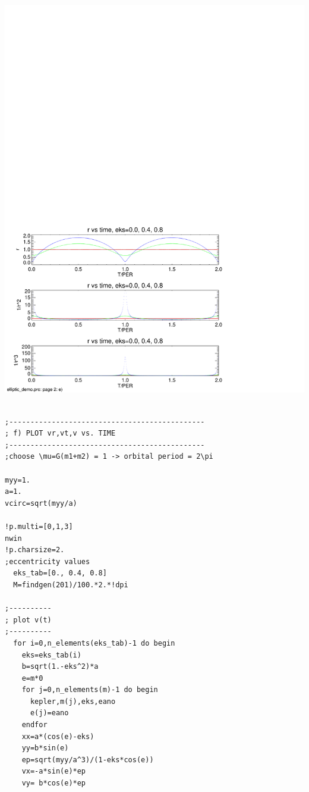 \documentclass[a4paper,12pt]{article}
\def\red{\color{red}}
\begin{document}
{{{{\vspace{-12cm}
\includegraphics[width=0.9\paperwidth]{elliptic_demo_2.pdf}
\clearpage


{\red \scriptsize
\begin{verbatim}

;----------------------------------------------
; f) PLOT vr,vt,v vs. TIME
;----------------------------------------------
;choose \mu=G(m1+m2) = 1 -> orbital period = 2\pi

myy=1.
a=1.
vcirc=sqrt(myy/a)

!p.multi=[0,1,3]
nwin
!p.charsize=2.
;eccentricity values
  eks_tab=[0., 0.4, 0.8]
  M=findgen(201)/100.*2.*!dpi

;---------- 
; plot v(t)
;---------- 
  for i=0,n_elements(eks_tab)-1 do begin
    eks=eks_tab(i)
    b=sqrt(1.-eks^2)*a
    e=m*0
    for j=0,n_elements(m)-1 do begin
      kepler,m(j),eks,eano
      e(j)=eano
    endfor
    xx=a*(cos(e)-eks)
    yy=b*sin(e)
    ep=sqrt(myy/a^3)/(1-eks*cos(e))
    vx=-a*sin(e)*ep
    vy= b*cos(e)*ep


\end{verbatim}}}}}}
\end{document}
